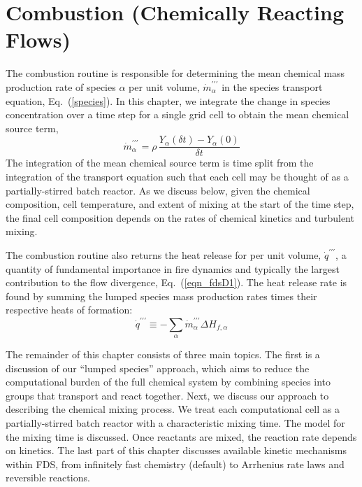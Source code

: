 \chapter{Combustion (Chemically Reacting Flows)}
\label{chapter:combustion}

\label{combustionsection}
The combustion routine is responsible for determining the mean chemical mass production rate of species $\alpha$ per unit volume, $\dot{m}^{\prime\prime\prime}_{\alpha}$ in the species transport equation, Eq.~(\ref{species}). In this chapter, we integrate the change in species concentration over a time step for a single grid cell to obtain the mean chemical source term,
\begin{equation}\label{eq:m_tprime_alpha}
\dot{m}^{\prime\prime\prime}_{\alpha}=\rho \,\frac{Y_\alpha(\delta t) - Y_\alpha(0)}{\delta t}
\end{equation}
The integration of the mean chemical source term is time split from the integration of the transport equation such that each cell may be thought of as a partially-stirred batch reactor.  As we discuss below, given the chemical composition, cell temperature, and extent of mixing at the start of the time step, the final cell composition depends on the rates of chemical kinetics and turbulent mixing.

The combustion routine also returns the heat release for per unit volume, $\dot{q}^{\prime\prime\prime}$, a quantity of fundamental importance in fire dynamics and typically the largest contribution to the flow divergence, Eq.~(\ref{eqn_fdsD1}).  The heat release rate is found by summing the lumped species mass production rates times their respective heats of formation:
\begin{equation}\label{eq:q_tprime}
\dot{q}^{\prime\prime\prime} \equiv -\displaystyle \sum_{\alpha} \dot{m}_\alpha^{\prime\prime\prime} \Delta H_{f,\alpha}
\end{equation}

The remainder of this chapter consists of three main topics.  The first is a discussion of our ``lumped species'' approach, which aims to reduce the computational burden of the full chemical system by combining species into groups that transport and react together.  Next, we discuss our approach to describing the chemical mixing process.  We treat each computational cell as a partially-stirred batch reactor with a characteristic mixing time.  The model for the mixing time is discussed.  Once reactants are mixed, the reaction rate depends on kinetics.  The last part of this chapter discusses available kinetic mechanisms within FDS, from infinitely fast chemistry (default) to Arrhenius rate laws and reversible reactions.

